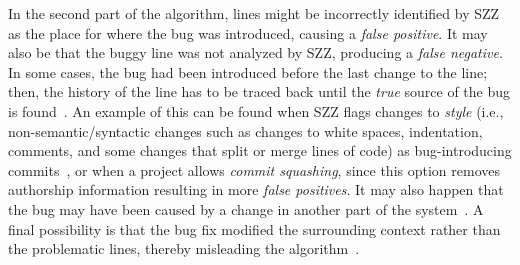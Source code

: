 \documentclass[a4paper, 12pt]{book}
\begin{document}
In the second part of the algorithm, lines might be incorrectly identified by SZZ as the place for where the bug was introduced, causing a \emph{false positive}. It may also be that the buggy line was not analyzed by SZZ, producing a \emph{false negative}. In some cases, the bug had been introduced before the last change to the line; then, the history of the line has to be traced back until the \emph{true} source of the bug is found~\cite{williams2008szz}. An example of this can be found when SZZ flags changes to \emph{style} (i.e., non-semantic/syntactic changes such as changes to white spaces, indentation, comments, and some changes that split or merge lines of code) as bug-introducing commits~\cite{da2016framework}, or when a project allows \emph{commit squashing}, since this option removes authorship information resulting in more \emph{false positives}. It may also happen that the bug may have been caused by a change in another part of the system~\cite{german2009change}. A final possibility is that the bug fix modified the surrounding context rather than the problematic lines, thereby misleading the algorithm~\cite{davies2014comparing}.
\end{document}
